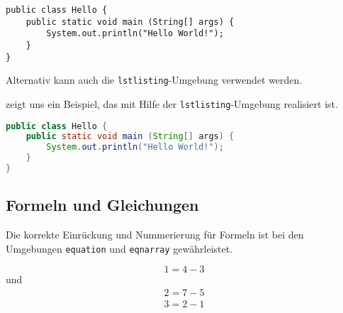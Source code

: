 \documentclass[utf8,biblatex]{lni}
\begin{document}
\begin{verbatim}
public class Hello {
    public static void main (String[] args) {
        System.out.println("Hello World!");
    }
}
\end{verbatim}

Alternativ kann auch die \texttt{lstlisting}-Umgebung verwendet werden.

 zeigt uns ein Beispiel, das mit Hilfe der \texttt{lstlisting}-Umgebung realisiert ist.

\begin{lstlisting}[caption={Beschreibung}, label=L1, language=Java]
public class Hello {
    public static void main (String[] args) {
        System.out.println("Hello World!");
    }
}
\end{lstlisting}

\subsection{Formeln und Gleichungen}

Die korrekte Einrückung und Nummerierung für Formeln ist bei den Umgebungen \texttt{equation} und \texttt{eqnarray} gewährleistet.

\begin{equation}
  1=4-3
\end{equation}
und
\begin{eqnarray}
  2=7-5\\
  3=2-1
\end{eqnarray}

\printbibliography
\end{document}
